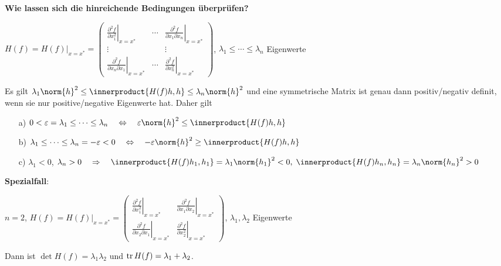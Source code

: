 \linie

\textbf{Wie lassen sich die hinreichende Bedingungen überprüfen?}

$H(f) = \left.H(f)\right|_{x=x^\ast} = \begin{pmatrix}
\left.\frac{\partial^2 f}{\partial x_1^2}\right|_{x=x^\ast} &
\cdots &
\left.\frac{\partial^2 f}{\partial x_1 \partial x_n}\right|_{x=x^\ast} \\
\vdots & & \vdots \\
\left.\frac{\partial^2 f}{\partial x_n \partial x_1}\right|_{x=x^\ast} &
\cdots &
\left.\frac{\partial^2 f}{\partial x_n^2}\right|_{x=x^\ast}
\end{pmatrix}$,
$\lambda_1 \le \dotsb \le \lambda_n$ Eigenwerte

Es gilt $\lambda_1 \norm{h}^2 \le \innerproduct{H(f)h, h} \le \lambda_n \norm{h}^2$
und eine symmetrische Matrix ist genau dann positiv/negativ definit, wenn
sie nur positive/negative Eigenwerte hat.
Daher gilt
\begin{itemize}
    \item[a)]
    $0 < \varepsilon = \lambda_1 \le \dotsb \le \lambda_n
    \quad\Leftrightarrow\quad \varepsilon \norm{h}^2 \le \innerproduct{H(f)h, h}$

    \item[b)]
    $\lambda_1 \le \dotsb \le \lambda_n = -\varepsilon < 0
    \quad\Leftrightarrow\quad -\varepsilon \norm{h}^2 \ge \innerproduct{H(f)h, h}$

    \item[c)]
    $\lambda_1 < 0$, $\lambda_n > 0
    \quad\Rightarrow\quad \innerproduct{H(f)h_1, h_1} = \lambda_1 \norm{h_1}^2 < 0,\;
    \innerproduct{H(f)h_n, h_n} = \lambda_n \norm{h_n}^2 > 0$
\end{itemize}

\linie

\textbf{Spezialfall}:

$n = 2$, $H(f) = \left.H(f)\right|_{x=x^\ast} = \begin{pmatrix}
\left.\frac{\partial^2 f}{\partial x_1^2}\right|_{x=x^\ast} &
\left.\frac{\partial^2 f}{\partial x_1 \partial x_2}\right|_{x=x^\ast} \\
\left.\frac{\partial^2 f}{\partial x_2 \partial x_1}\right|_{x=x^\ast} &
\left.\frac{\partial^2 f}{\partial x_2^2}\right|_{x=x^\ast}
\end{pmatrix}$,
$\lambda_1, \lambda_2$ Eigenwerte

Dann ist $\det H(f) = \lambda_1 \lambda_2$ und
$\operatorname{tr} H(f) = \lambda_1 + \lambda_2$.

